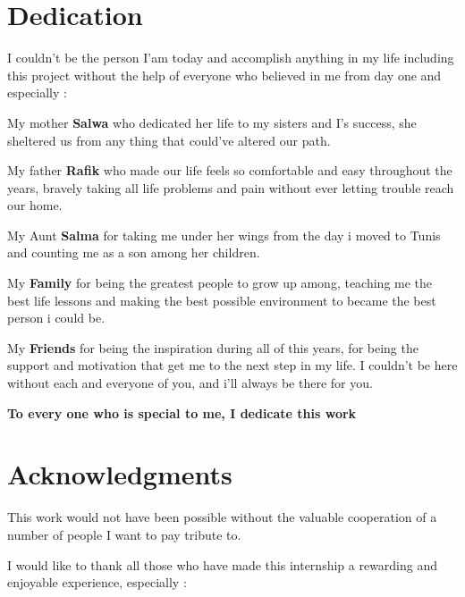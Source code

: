 \chapter*{Dedication}

I couldn't be the person I'am today and accomplish anything in my life including this project without the help of everyone who believed in me from day one and especially :\newline


My mother \textbf{Salwa}  who dedicated her life to my sisters and I's success, she sheltered us from any thing that could've altered our path.\newline

My father \textbf{Rafik}  who made our life feels so comfortable and easy throughout the years, bravely taking all life problems and pain without ever letting trouble reach our home.\newline  

My Aunt \textbf{Salma} for taking me under her wings from the day i moved to Tunis and counting me as a son among her children.\newline

My \textbf{Family} for being the greatest people to grow up among, teaching me the best life lessons and making the best possible environment to became the best person i could be.\newline

My \textbf{Friends} for being the inspiration during all of this years, for being the support and motivation that get me to the next step in my life. I couldn't be here without each and everyone of you, and i'll always be there for you.\newline

\begin{center}
	\textbf{To every one who is special to me, I dedicate this work}
\end{center}


\chapter*{Acknowledgments}

This work would not have been possible without the valuable cooperation of a number of people I want to pay tribute to.\newline

I would like to thank all those who have made this internship a rewarding and enjoyable experience, especially :\newline

